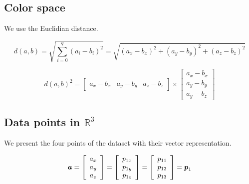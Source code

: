 \documentclass{article}
\newcommand{\bm}[1]{\mbox{\boldmath$#1$}}
\begin{document}
\subsection{Color space}

We use the Euclidian distance.

\[
d(a,b) =
\sqrt{\sum_{i=0}^q (a_i - b_i)^2} =
\sqrt{(a_x - b_x)^2 + (a_y - b_y)^2 + (a_z - b_z)^2}
\]

\[
d(a,b)^2 = 
\left[\begin{array}{ccc}
 a_x - b_x & a_y - b_y  & a_z - b_z
\end{array}\right]
\times
\left[\begin{array}{c}
 a_x - b_x \\
 a_y - b_y \\
 a_y - b_z
\end{array}\right]
\]

\subsection{Data points in $\mathbb{R}^3$}
We present the four points of the dataset with their vector representation.

\[
\bm{a} = 
\left[\begin{array}{c}
 a_x \\
 a_y \\
 a_z
\end{array}\right]
=
\left[\begin{array}{c}
 p_{1x} \\
 p_{1y} \\
 p_{1z}
\end{array}\right]
=
\left[\begin{array}{c}
 p_{11} \\
 p_{12} \\
 p_{13}
\end{array}\right]
= \bm{p}_1
\]
\end{document}
